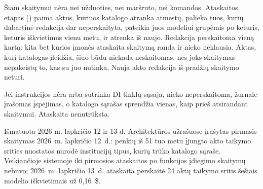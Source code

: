 Šiam skaitymui nėra nei užduoties, nei maršruto, nei komandos. Ataskaitos etapas
 () paima aktus, kuriuos katalogo atranka atmestų,
palieka tuos, kurių dabartinė redakcija dar neperskaityta, pateikia juos modeliui grupėmis po
keturis, keturis iškvietimus vienu metu, ir atrenka iš naujo. Redakcija perskaitoma vieną kartą:
kita bet kurios įmonės ataskaita skaitymą randa ir nieko neklausia. Aktas, kurį katalogas
įleidžia, šiuo būdu niekada neskaitomas, nes joks skaitymas nepakeistų to, kas su juo nutinka.
Nauja akto redakcija iš pradžių skaitymo neturi.

Jei instrukcijos nėra arba sutrinka DI tinklų sąsaja, nieko neperskaitoma, žurnale įrašomas
įspėjimas, o katalogo sąrašas sprendžia vienas, kaip prieš atsirandant skaitymui. Ataskaita
nenutrūksta.

\begin{lessonbox}{Išmatuota 2026 m. lapkričio 12 ir 13 d.}
Architektūros užrašuose įrašytas pirmasis skaitymas 2026~m. lapkričio 12~d.: penkių iš 51 tuo
metu įjungto akto taikymo srities nuostatos nurodė institucijų tipus, kurių trūko katalogo
sąraše. Veikiančioje sistemoje iki pirmosios ataskaitos po funkcijos įdiegimo skaitymų nebuvo;
2026~m. lapkričio 13~d. ataskaita perskaitė 24 aktų taikymo sritis šešiais modelio iškvietimais
už 0,16~\$.
\end{lessonbox}


